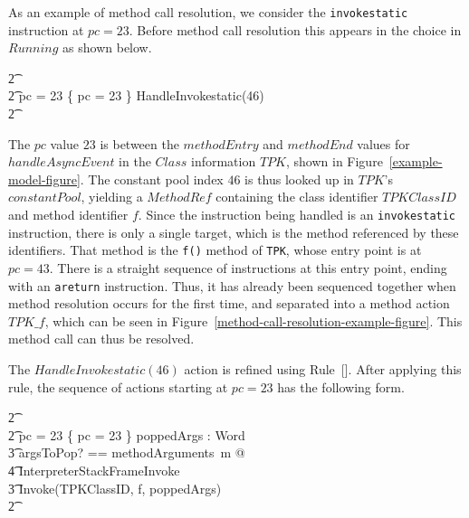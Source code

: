 As an example of method call resolution, we consider the
\texttt{invokestatic} instruction at $pc = 23$. 
Before method call resolution this appears in the choice in $Running$
as shown below.
\begin{circusaction}
  \t2 {} \cdots {} \\
  \t2 {} \circelse pc = 23 \circthen \{ pc = 23 \} \circseq HandleInvokestatic(46) \\
  \t2 {} \cdots {} \\
\end{circusaction}
The $pc$ value $23$ is between the $methodEntry$ and $methodEnd$
values for $handleAsyncEvent$ in the $Class$ information $TPK$, shown
in Figure~\ref{example-model-figure}.
The constant pool index $46$ is thus looked up in $TPK$'s
$constantPool$, yielding a $MethodRef$ containing the class identifier
$TPKClassID$ and method identifier $f$.
Since the instruction being handled is an \texttt{invokestatic}
instruction, there is only a single target, which is the method
referenced by these identifiers.
That method is the \texttt{f()} method of \texttt{TPK}, whose entry
point is at $pc = 43$.
There is a straight sequence of instructions at this entry point,
ending with an \texttt{areturn} instruction. 
Thus, it has already been sequenced together when method resolution
occurs for the first time, and separated into a method action
$TPK\_f$, which can be seen in
Figure~\ref{method-call-resolution-example-figure}.
This method call can thus be resolved.

The $HandleInvokestatic(46)$ action is refined using
Rule~[].
After applying this rule, the sequence of actions starting at
$pc = 23$ has the following form.
\begin{circusaction}
  \t2 {} \cdots {} \\
  \t2 {} \circelse pc = 23 \circthen \{ pc = 23 \} \circseq \circvar poppedArgs : \seq Word \circspot \\
  \t3 \lschexpract \exists argsToPop? == methodArguments~m @ \\
  \t4 InterpreterStackFrameInvoke \rschexpract \circseq \\
  \t3 Invoke(TPKClassID, f, poppedArgs) \\
  \t2 {} \cdots {}
\end{circusaction}

